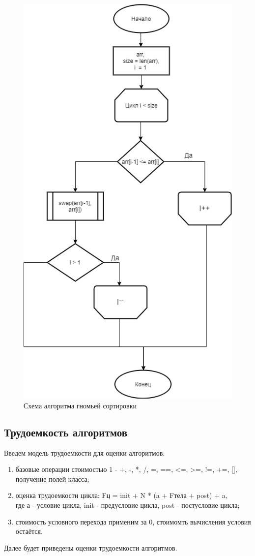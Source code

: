 \documentclass[a4paper, 12pt]{article}
\begin{document}
\begin{flushleft}
\begin{figure}[h!]
		\centering \includegraphics[scale=2.2]{gnome_graph}
		\centering \caption{Схема алгоритма гномьей сортировки}
	\end{figure}
	\clearpage
	\newpage
	\subsection{Трудоемкость алгоритмов}
	Введем модель трудоемкости для оценки алгоритмов:
	\begin{enumerate}
		\item базовые операции стоимостью 1 - +, -, *, /, =, ==, <=, >=, !=, +=, [], получение полей класса;
		\item оценка трудоемкости цикла: Fц = init + N * (a + Fтела + post) + a, \\где а - условие цикла, init - предусловие цикла, post - постусловие цикла;
		\item стоимость условного перехода применим за 0, стоимомть вычисления условия остаётся. 
	\end{enumerate}
	Далее будет приведены оценки трудоемкости алгоритмов.

\end{flushleft}
\end{document}
